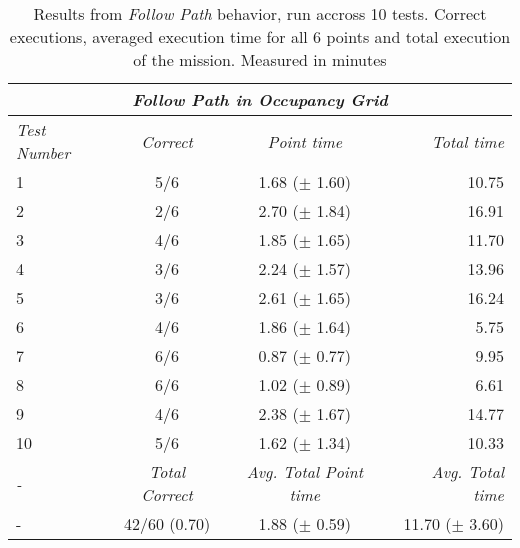 \begin{table}[!h]
  \centering
  \begin{tabular}{lccr} \toprule
    \multicolumn{4}{c}{\textit{Follow Path in Occupancy Grid}}                        \\ \midrule
    \textit{Test Number} & \textit{Correct} & \textit{Point time} & \textit{Total time} \\ \midrule
      1 & 5/6 & 1.68 ($\pm$ 1.60) & 10.75 \\ \hline
      2 & 2/6 & 2.70 ($\pm$ 1.84) & 16.91 \\ \hline
      3 & 4/6 & 1.85 ($\pm$ 1.65) & 11.70 \\ \hline
      4 & 3/6 & 2.24 ($\pm$ 1.57) & 13.96 \\ \hline
      5 & 3/6 & 2.61 ($\pm$ 1.65) & 16.24 \\ \hline
      6 & 4/6 & 1.86 ($\pm$ 1.64) & 5.75 \\ \hline
      7 & 6/6 & 0.87 ($\pm$ 0.77) & 9.95 \\ \hline
      8 & 6/6 & 1.02 ($\pm$ 0.89) & 6.61 \\ \hline
      9 & 4/6 & 2.38 ($\pm$ 1.67) & 14.77 \\ \hline
      10 & 5/6 & 1.62 ($\pm$ 1.34) & 10.33 \\ \hline
      \textit{-} & \textit{Total Correct} & \textit{Avg. Total Point time} & \textit{Avg. Total time} \\ \midrule
      - & 42/60 (0.70) & 1.88 ($\pm$ 0.59) & 11.70 ($\pm$ 3.60) \\ \bottomrule
      \hline
  \end{tabular}
  \caption{Results from \textit{Follow Path} behavior, run accross 10 tests. Correct executions, averaged execution time for all 6 points and total execution of the mission. Measured in minutes}
  \label{ch_5:table:go_to_point_results}
\end{table}
